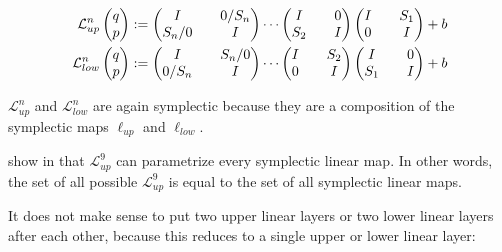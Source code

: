 \documentclass[twoside,a4paper]{article}
\begin{document}
\begin{align*}
	\mathcal{L}^{n}_{up} \begin{pmatrix} q \\ p \end{pmatrix} &:= \begin{pmatrix}
		I && 0 / S_n \\
		S_n / 0 && I
	\end{pmatrix}
	\cdots
	\begin{pmatrix}
		I && 0 \\
		S_2 && I
	\end{pmatrix}
	\begin{pmatrix}
		I && S_1 \\
		0 && I
	\end{pmatrix} + b \\
	\mathcal{L}^{n}_{low} \begin{pmatrix} q \\ p \end{pmatrix} &:= \begin{pmatrix}
		I && S_n / 0 \\
		0 / S_n && I
	\end{pmatrix}
	\cdots
	\begin{pmatrix}
		I && S_2 \\
		0 && I
	\end{pmatrix}
	\begin{pmatrix}
		I && 0 \\
		S_1 && I
	\end{pmatrix} + b
\end{align*}

$\mathcal{L}^{n}_{up}$ and $\mathcal{L}^{n}_{low}$ are again symplectic because they 
are a composition of the symplectic maps $\ell_{up}$ and $\ell_{low}$.

\citeauthor{jin2020unit} show in \cite{jin2020unit} that $\mathcal{L}^{9}_{up}$
can parametrize every symplectic linear map. In other words, 
the set of all possible $\mathcal{L}^{9}_{up}$ is equal to the set of all symplectic linear maps.

It does not make sense to put two upper linear layers or two lower linear layers after each other,
because this reduces to a single upper or lower linear layer:
\end{document}
